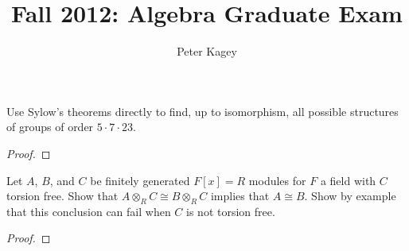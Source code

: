 \documentclass{article}
\newenvironment{problem}[2][Problem]{\begin{trivlist}
\item[\hskip \labelsep {\bfseries #1}\hskip \labelsep {\bfseries #2.}]}{\end{trivlist}}
\begin{document}
\title{Fall 2012: Algebra Graduate Exam}
\author{Peter Kagey}

\maketitle

\begin{problem}{1}
  Use Sylow's theorems directly to find, up to isomorphism, all possible structures of groups of order $5\cdot7\cdot23$.
\end{problem}

\begin{proof}
\end{proof}
\pagebreak

\begin{problem}{2}
  Let $A$, $B$, and $C$ be finitely generated $F[x] = R$ modules for $F$ a field with $C$ torsion free. Show that $A \otimes_R C \cong B \otimes_R C$ implies that $A \cong B$.
  Show by example that this conclusion can fail when $C$ is not torsion free.
\end{problem}

\begin{proof}
\end{proof}
\end{document}
